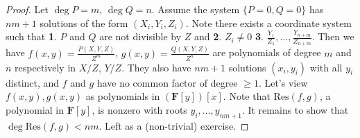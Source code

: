 \documentclass[12pt]{article}
\newcommand{\F}{\mathbf{F}}
\newcommand{\C}{\mathbb{C}}
\renewcommand{\P}{\mathbb{P}}
\newcommand{\Res}{\mathrm{Res}}
\begin{document}
    \begin{proof}
        Let $\deg P = m$, $\deg Q = n$. Assume the system $\{P = 0, Q = 0\}$ has $nm + 1$ solutions of the form $(X_i, Y_i, Z_i)$. Note there exists a coordinate system such that \textbf{1}. $P$ and $Q$ are not divisible by $Z$ and \textbf{2}. $Z_i \neq 0$ \textbf{3}. $\frac{Y_1}{Z_1}, \dots, \frac{Y_{n+m}}{Z_{n+m}}$. Then we have $f(x, y) = \frac{P(X, Y, Z)}{Z^m}$, $g(x, y) = \frac{Q(X, Y, Z)}{Z^n}$ are polynomials of degree $m$ and $n$ respectively in $X/Z$, $Y/Z$. They also have $nm + 1$ solutions $(x_i, y_i)$ with all $y_i$ distinct, and $f$ and $g$ have no common factor of degree $\geq 1$. Let's view $f(x, y), g(x, y)$ as polynomials in $(\F[y])[x]$. Note that $\Res(f, g)$, a polynomial in $\F[y]$, is nonzero with roots $y_i, \dots, y_{nm+1}$. It remains to show that $\deg \Res(f, g) < nm$. Left as a (non-trivial) exercise.
    \end{proof}
\end{document}
